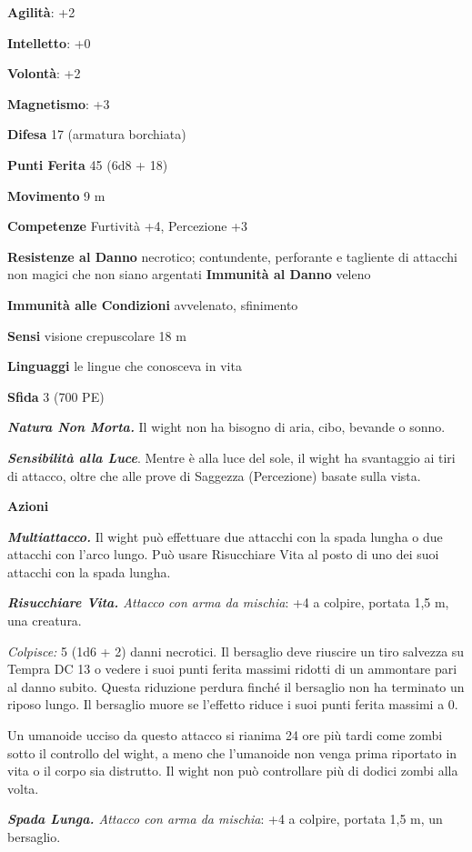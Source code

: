\begin{multicols}{2}
\textbf{Agilità}: +2

\textbf{Intelletto}: +0

\textbf{Volontà}: +2

\textbf{Magnetismo}: +3

\textbf{Difesa} 17 (armatura borchiata)

\textbf{Punti Ferita} 45 (6d8 + 18)

\textbf{Movimento} 9 m

\textbf{Competenze} Furtività +4, Percezione +3

\textbf{Resistenze al Danno} necrotico; contundente, perforante e
tagliente di attacchi non magici che non siano argentati
\textbf{Immunità al Danno} veleno

\textbf{Immunità alle Condizioni} avvelenato, sfinimento

\textbf{Sensi} visione crepuscolare 18 m

\textbf{Linguaggi} le lingue che conosceva in vita

\textbf{Sfida} 3 (700 PE)

\emph{\textbf{Natura Non Morta.}} Il wight non ha bisogno di aria, cibo,
bevande o sonno.

\emph{\textbf{Sensibilità alla Luce}}. Mentre è alla luce del sole, il
wight ha svantaggio ai tiri di attacco, oltre che alle prove di Saggezza
(Percezione) basate sulla vista.

\textbf{Azioni}

\emph{\textbf{Multiattacco.}} Il wight può effettuare due attacchi con
la spada lungha o due attacchi con l'arco lungo. Può usare Risucchiare
Vita al posto di uno dei suoi attacchi con la spada lungha.

\emph{\textbf{Risucchiare Vita.} Attacco con arma da mischia}: +4 a
colpire, portata 1,5 m, una creatura.

\emph{Colpisce:} 5 (1d6 + 2) danni necrotici. Il bersaglio deve riuscire
un tiro salvezza su Tempra DC 13 o vedere i suoi punti ferita
massimi ridotti di un ammontare pari al danno subito. Questa riduzione
perdura finché il bersaglio non ha terminato un riposo lungo. Il
bersaglio muore se l'effetto riduce i suoi punti ferita massimi a 0.

Un umanoide ucciso da questo attacco si rianima 24 ore più tardi come
zombi sotto il controllo del wight, a meno che l'umanoide non venga
prima riportato in vita o il corpo sia distrutto. Il wight non può
controllare più di dodici zombi alla volta.

\emph{\textbf{Spada Lunga.} Attacco con arma da mischia}: +4 a colpire,
portata 1,5 m, un bersaglio.


\end{multicols}
